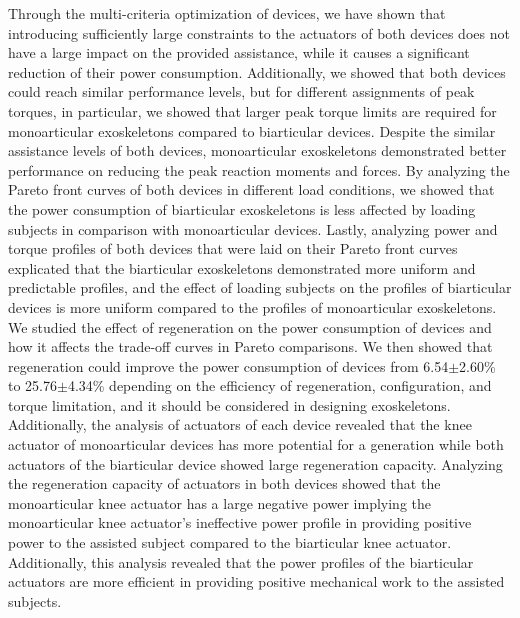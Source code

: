 \documentclass[10pt,letterpaper]{article}
\begin{document}
Through the multi-criteria optimization of devices, we have shown that introducing sufficiently large constraints to the actuators of both devices does not have a large impact on the provided assistance, while it causes a significant reduction of their power consumption. Additionally, we showed that both devices could reach similar performance levels, but for different assignments of peak torques, in particular, we showed that larger peak torque limits are required for monoarticular exoskeletons compared to biarticular devices. Despite the similar assistance levels of both devices, monoarticular exoskeletons demonstrated better performance on reducing the peak reaction moments and forces. By analyzing the Pareto front curves of both devices in different load conditions, we showed that the power consumption of biarticular exoskeletons is less affected by loading subjects in comparison with monoarticular devices. Lastly, analyzing power and torque profiles of both devices that were laid on their Pareto front curves explicated that the biarticular exoskeletons demonstrated more uniform and predictable profiles, and the effect of loading subjects on the profiles of biarticular devices is more uniform compared to the profiles of monoarticular exoskeletons.\\
We studied the effect of regeneration on the power consumption of devices and how it affects the trade-off curves in Pareto comparisons. We then showed that regeneration could improve the power consumption of devices from 6.54$\pm$2.60\% to 25.76$\pm$4.34\% depending on the efficiency of regeneration, configuration, and torque limitation, and it should be considered in designing exoskeletons. Additionally, the analysis of actuators of each device revealed that the knee actuator of monoarticular devices has more potential for a generation while both actuators of the biarticular device showed large regeneration capacity. Analyzing the regeneration capacity of actuators in both devices showed that the monoarticular knee actuator has a large negative power implying the monoarticular knee actuator's ineffective power profile in providing positive power to the assisted subject compared to the biarticular knee actuator. Additionally, this analysis revealed that the power profiles of the biarticular actuators are more efficient in providing positive mechanical work to the assisted subjects.\\
\end{document}

